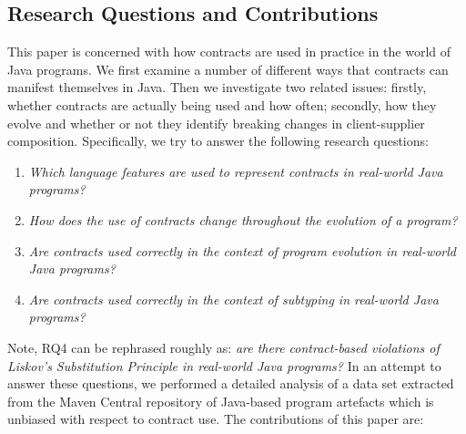 \documentclass[a4paper,UKenglish]{lipics-v2016}
\begin{document}
\subsection{Research Questions and Contributions}

This paper is concerned with how contracts are used in practice in the world of Java programs. We first examine a number of different ways that contracts can manifest themselves in Java. Then we investigate two related issues: firstly, whether contracts are actually being used and how often; secondly, how they evolve and whether or not they identify breaking changes in client-supplier composition. Specifically, we try to answer the following research questions: 

\begin{enumerate}
	
	\item [{\bf RQ1}] {\em Which language features are used to represent contracts in real-world Java programs?}\\
	
	\item [{\bf RQ2}] {\em How does the use of contracts change throughout the evolution of a program?}\\
	
	\item [{\bf RQ3}] {\em Are contracts used correctly in the context of program evolution in real-world Java programs?}\\
	
	\item [{\bf RQ4}] {\em Are contracts used correctly in the context of subtyping in real-world Java programs?}
	
\end{enumerate}

Note, RQ4 can be rephrased roughly as: {\em are there contract-based violations of Liskov's Substitution Principle in real-world Java programs?}  In an attempt to answer these questions, we performed a detailed analysis of a data set extracted from the Maven Central repository of Java-based program artefacts which is unbiased with respect to contract use.   The contributions of this paper are:
\end{document}
